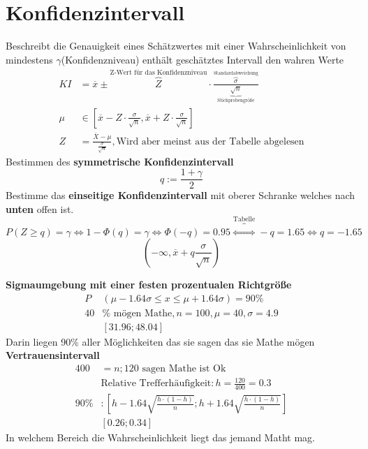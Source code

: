 \section{Konfidenzintervall}
Beschreibt die Genauigkeit eines Schätzwertes mit einer Wahrscheinlichkeit von mindestens $\gamma$(Konfidenzniveau) enthält geschätztes Intervall den wahren Werte
\begin{align*}
    KI &= \overline{x} \pm \overbrace{Z}^{\textrm{Z-Wert für das Konfidenzniveau}} \cdot \frac{\overbrace{\sigma}^{\textrm{Standardabweichung}}}{\underbrace{\sqrt{n}}_{\textrm{Stichprobengröße}} }\\
    \mu& \in \left[\overline{x}-Z\cdot \frac{\sigma}{\sqrt{n}},\overline{x}+Z\cdot \frac{\sigma}{\sqrt{n}}\right] \\
    Z &=\frac{\overline{X}-\mu}{\frac{\sigma}{\sqrt{n}}},\textrm{Wird aber meinst aus der Tabelle abgelesen} 
\end{align*}
Bestimmen des \textbf{symmetrische Konfidenzintervall} \[q:=\frac{1+\gamma}{2}\]
Bestimme das \textbf{einseitige Konfidenzintervall} mit oberer Schranke welches nach \textbf{unten} offen ist.
\[P(Z\geq q)= \gamma \Leftrightarrow 1-\Phi (q)= \gamma \Leftrightarrow \Phi (-q) =0.95 \overbrace{\Leftrightarrow}^{\textrm{Tabelle}}-q = 1.65 \Leftrightarrow q = -1.65 \]
\[(-\infty,\overline{x}+q\frac{\sigma}{\sqrt{n}})\]

\textbf{Sigmaumgebung mit einer festen prozentualen Richtgröße}
\begin{align*}
    P&(\mu -1.64 \sigma \leq x\leq \mu+1.64\sigma) = 90\%\\
    40&\%\textrm{ mögen Mathe}, n=100, \mu = 40, \sigma = 4.9\\
    &[31.96; 48.04]
\end{align*}
Darin liegen 90\% aller Möglichkeiten das sie sagen das sie Mathe mögen\\
\textbf{Vertrauensintervall}
\begin{align*}
    400 &= n; 120 \textrm{ sagen Mathe ist Ok}\\
    &\textrm{Relative Trefferhäufigkeit}: h= \frac{120}{400} = 0.3\\
    90\%&:\left[ h-1.64\sqrt{\frac{h\cdot(1-h)}{n}};h+ 1.64\sqrt{\frac{h\cdot(1-h)}{n}}\right]\\
    &[0.26;0.34]
\end{align*}
In welchem Bereich die Wahrscheinlichkeit liegt das jemand Matht mag.

